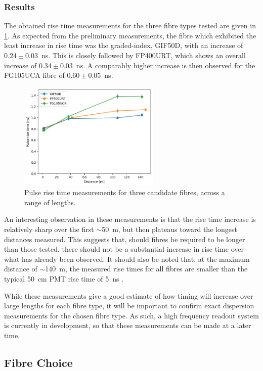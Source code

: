 \documentclass[a4paper,11pt]{article}
\let\oldsim\sim
\renewcommand{\sim}{{\oldsim}}
\begin{document}
\subsubsection{Results}\label{sec:fibre:sub:disp:sub:method}

The obtained rise time measurements for the three fibre types tested are given in \cref{fig:disprise}. As expected from the preliminary measurements, the fibre which exhibited the least increase in rise time was the graded-index, GIF50D, with an increase of $0.24\pm0.03$~ns. This is closely followed by FP400URT, which shows an overall increase of $0.34\pm0.03$~ns. A comparably higher increase is then observed for the FG105UCA fibre of $0.60\pm0.05$~ns.
\begin{figure}[h]
\centering
\includegraphics[width=0.6\textwidth]{RiseTimeOct24_zero.png}
\caption{Pulse rise time measurements for three candidate fibres, across a range of lengths.}\label{fig:disprise}
\end{figure}
An interesting observation in these measurements is that the rise time increase is relatively sharp over the first $\sim$50~m, but then plateaus toward the longest distances measured. This suggests that, should fibres be required to be longer than those tested, there should not be a substantial increase in rise time over what has already been observed. It should also be noted that, at the maximum distance of $\sim$140~m, the measured rise times for all fibres are smaller than the typical 50~cm PMT rise time of 5~ns \cite{bib:hkpmt}.

While these measurements give a good estimate of how timing will increase over large lengths for each fibre type, it will be important to confirm exact dispersion measurements for the chosen fibre type. As such, a high frequency readout system is currently in development, so that these measurements can be made at a later time.

\subsection{Fibre Choice}\label{sec:fibre:sub:choice}
\end{document}
